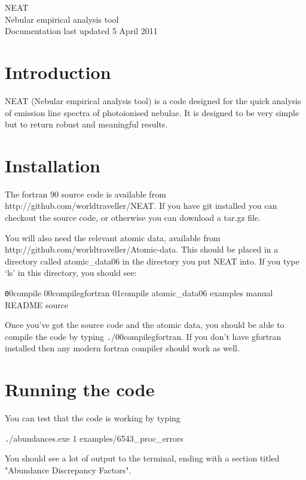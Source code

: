 \documentclass[11pt,a4paper]{article}
\begin{document}
\begin{center}
{\Huge NEAT}\\
\vspace{3cm}
{\huge Nebular empirical analysis tool}\\
\vspace{3cm}
{\large Documentation last updated 5 April 2011}
\end{center}

\newpage

\section{Introduction}

NEAT (Nebular empirical analysis tool) is a code designed for the quick analysis of emission line spectra of photoionised nebulae.  It is designed to be very simple but to return robust and meaningful results.

\section{Installation}

The fortran 90 source code is available from http://github.com/worldtraveller/NEAT.  If you have git installed you can checkout the source code, or otherwise you can download a tar.gz file.

You will also need the relevant atomic data, available from http://github.com/worldtraveller/Atomic-data.  This should be placed in a directory called atomic\_data06 in the directory you put NEAT into.  If you type `ls' in this directory, you should see:

{\texttt 00compile  00compilegfortran  01compile  atomic\_data06 examples  manual  README  source}

Once you've got the source code and the atomic data, you should be able to compile the code by typing {\texttt ./00compilegfortran}.  If you don't have gfortran installed then any modern fortran compiler should work as well.

\section{Running the code}

You can test that the code is working by typing

{\texttt ./abundances.exe 1 examples/6543\_proc\_errors}

You should see a lot of output to the terminal, ending with a section titled "Abundance Discrepancy Factors".
\end{document}
